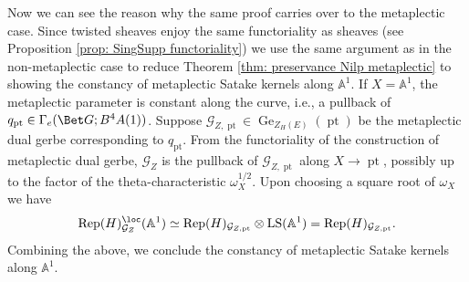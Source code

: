 \documentclass[10pt]{amsart}
\theoremstyle{remark}
\newcommand{\afl}{\mathbb{A}^1}
\newcommand{\on}{\operatorname}
\newcommand{\cG}{\mathcal{G}}
\newcommand{\Rep}{\on{Rep}}
\newcommand{\LS}{\on{LS}}
\newcommand{\pt}{\on{pt}}
\begin{document}
Now we can see the reason why the same proof carries over to the metaplectic case. Since twisted sheaves enjoy the same functoriality as sheaves (see Proposition \ref{prop: SingSupp functoriality}) we use the same argument as in the non-metaplectic case to reduce Theorem \ref{thm: preservance Nilp metaplectic} to showing the constancy of metaplectic Satake kernels along $\afl$. If $X=\afl$, the metaplectic parameter is constant along the curve, i.e., a pullback of $q_{\pt}\in \Gamma_e(\Bet G; B^4 A(1))$. Suppose $\cG_{Z,\pt}\in \on{Ge}_{Z_H(E)}(\pt)$ be the metaplectic dual gerbe corresponding to $q_{\pt}$. From the functoriality of the construction of metaplectic dual gerbe, $\cG_Z$ is the pullback  of $\cG_{Z,\pt}$ along $X\rightarrow \pt$, possibly up to the factor of the theta-characteristic $\omega^{1/2}_X$. Upon choosing a square root of $\omega_X$ we have 
\[\Rep(H)^{\loc}_{\cG_Z}(\afl)\simeq \Rep(H)_{\cG_{Z,\pt}}\otimes \LS(\afl)= \Rep(H)_{\cG_{Z,\pt}}.\]
Combining the above, we conclude the constancy of metaplectic Satake kernels along $\afl$.
\end{document}
